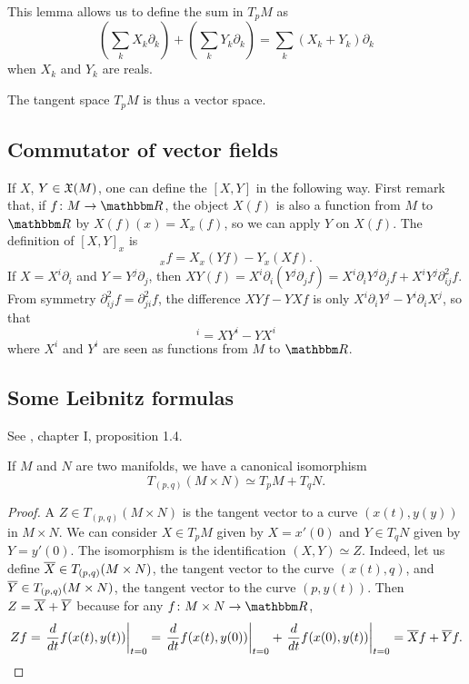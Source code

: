This lemma allows us to define the sum in \( T_pM\) as
\begin{equation}
    \left( \sum_kX_k\partial_k \right)+\left( \sum_kY_k\partial_k \right)=\sum_k (X_k+Y_k)\partial_k
\end{equation}
when \( X_k\) and \( Y_k\) are reals.

The tangent space \( T_pM\) is thus a vector space.


\subsection{Commutator of vector fields}

If $X$, $Y\in\mathfrak{X}(M)$, one can define the  $[X,Y]$ in the following way. First remark that, if $\dpt{f}{M}{\eR}$, the object $X(f)$ is also a function from $M$ to $\eR$ by $X(f)(x)=X_x(f)$, so we can apply $Y$ on $X(f)$. The definition of $[X,Y]_x$ is
\begin{equation}
  [X,Y]_xf=X_x(Yf)-Y_x(Xf).
\end{equation}
If $X=X^i\partial_i$ and $Y=Y^j\partial_j$, then 
$XY(f)=X^i\partial_i(Y^j\partial_jf)
     =X^i\partial_i Y^j\partial_j f+X^iY^j\partial^2_{ij}f$.
From symmetry $\partial^2_{ij}f=\partial^2_{ji}f$, the difference $XYf-YXf$ is only $X^i\partial_iY^j-Y^i\partial_iX^j$, so that
\begin{equation}
  [X,Y]^i=XY^i-YX^i
\end{equation}
where $X^i$ and $Y^i$ are seen as functions from $M$ to $\eR$.


\subsection{Some Leibnitz formulas}

See \cite{kobayashi}, chapter I, proposition 1.4.

\begin{lemma}
If $M$ and $N$ are two manifolds, we have a canonical isomorphism
\[
     T_{(p,q)}(M\times N)\simeq T_pM+T_qN.
\]
\label{lemLeibnitz}
\end{lemma}

\begin{proof}
A $Z\in T_{(p,q)}(M\times N)$ is the tangent vector to a curve $(x(t),y(y))$ in $M\times N$. We can consider $X\in T_pM$ given by $X=x'(0)$ and $Y\in T_qN$ given by $Y=y'(0)$. The isomorphism is the identification $(X,Y)\simeq Z$. Indeed, let us define $\overline{X}\in T_{(p,q)}(M\times N)$, the tangent vector to the curve $(x(t),q)$, and $\overline{Y}\in T_{(p,q)}(M\times N)$, the tangent vector to the curve $(p,y(t))$. Then $Z=\overline{X}+\overline{Y}$ because for any $\dpt{f}{M\times N}{\eR}$,
\begin{equation}
 Zf=\left.\frac{d}{dt}f(x(t),y(t))\right|_{t=0}
   =\left.\frac{d}{dt}f(x(t),y(0))\right|_{t=0}+\left.\frac{d}{dt}f(x(0),y(t))\right|_{t=0}
   =\overline{X} f+\overline{Y} f.
\end{equation}
\end{proof}

